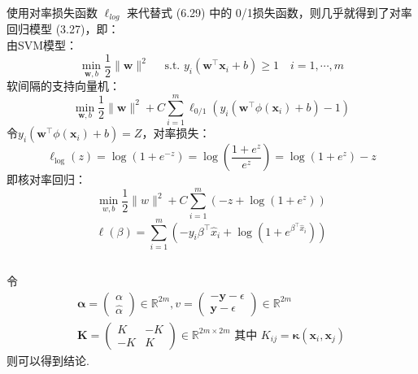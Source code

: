 \documentclass[UTF8,a4paper,AutoFakeBold,AutoFakeSlant]{article}
\begin{document}
使用对率损失函数 $\ell_{log}$ 来代替式 (6.29) 中的 0/1损失函数，则几乎就得到了对率回归模型 (3.27)，即：\\
由SVM模型：
\begin{equation*}
  \min _{\boldsymbol{w}, b} \frac{1}{2}\|\boldsymbol{w}\|^{2} \quad \text { s.t. } y_{i}\left(\boldsymbol{w}^{\top} \boldsymbol{x}_{i}+b\right) \geq 1 \quad i=1, \cdots, m
\end{equation*}
软间隔的支持向量机：
\begin{equation*}
  \min _{\boldsymbol{w}, b} \frac{1}{2}\|\boldsymbol{w}\|^{2}+C \sum_{i=1}^{m} \ell_{0 / 1}\left(y_{i}\left(\boldsymbol{w}^{\top} \phi\left(\boldsymbol{x}_{i}\right)+b\right)-1\right)
\end{equation*}
令$y_{i}\left(\boldsymbol{w}^{\top} \phi\left(\boldsymbol{x}_{i}\right)+b\right)=Z$，对率损失：
\begin{equation*}
  \ell_{\log }(z)=\log \left(1+e^{-z}\right)=\log \left(\frac{1+e^{z}}{e^{z}}\right)=\log \left(1+e^{z}\right)-z
\end{equation*}
即核对率回归：
\begin{equation*}
  \min _{w, b} \frac{1}{2}\|w\|^{2}+C \sum_{i=1}^{m}\left(-z+\log \left(1+e^{z}\right)\right)
\end{equation*}
\begin{equation*}
  \ell(\beta)=\sum_{i=1}^{m}\left(-y_{i} \beta^{\top} \widehat{x}_{i}+\log \left(1+e^{\beta^{\top} \widehat{x}_{i}}\right)\right)
\end{equation*}



\subsection{}

令
\begin{equation*}
  \begin{array}{c}
    \boldsymbol{\alpha}=\left(\begin{array}{c}
        \alpha \\
        \hat{\alpha}
      \end{array}\right) \in \mathbb{R}^{2 m}, v=\left(\begin{array}{c}
        -\boldsymbol{y}-\epsilon \\
        \boldsymbol{y}-\epsilon
      \end{array}\right) \in \mathbb{R}^{2 m} \\
    \boldsymbol{K}=\left(\begin{array}{cc}
        K  & -K \\
        -K & K
      \end{array}\right) \in \mathbb{R}^{2 m \times 2 m} \text { 其中 } K_{i j}=\boldsymbol{\kappa}\left(\boldsymbol{x}_{i}, \boldsymbol{x}_{j}\right)
  \end{array}
\end{equation*}
则可以得到结论.
\end{document}
